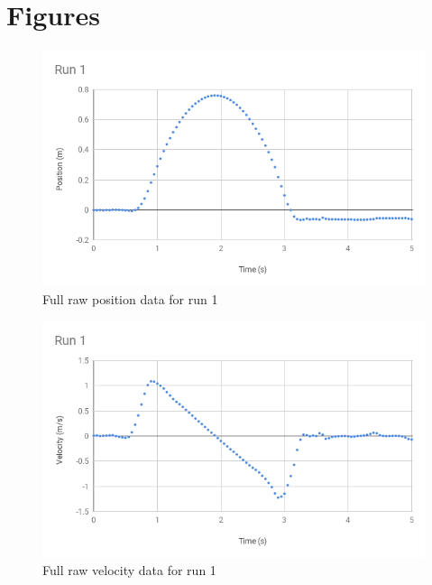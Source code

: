 \section{Figures}
%
\begin{figure}[ht]
    \centering
    \includegraphics[scale=0.71]{image/02-incline/Run1-d.png}
    \caption{Full raw position data for run 1}
    \label{figure:02.raw.d}
\end{figure}
%
\begin{figure}[ht]
    \centering
    \includegraphics[scale=0.71]{image/02-incline/Run1-v.png}
    \caption{Full raw velocity data for run 1}
    \label{figure:02.raw.v}
\end{figure}
%
